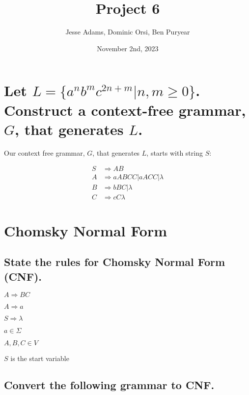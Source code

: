 \documentclass{article}
\title{Project 6}
\author{Jesse Adams, Dominic Orsi, Ben Puryear}
\date{November 2nd, 2023}
\begin{document}
\maketitle

\section{ Let $L = \{a^n b^m c^{2n+m} | n, m \ge 0\}$.  Construct a context-free grammar, $G$, that generates $L$.}

Our context free grammar, $G$, that generates $L$, starts with string $S$:

\begin{align*}
    S & \Rightarrow A B                           \\
    A & \Rightarrow a A B C C | a A C C | \lambda \\
    B & \Rightarrow b B C | \lambda               \\
    C & \Rightarrow c C \lambda
\end{align*}

\section{Chomsky Normal Form}

\subsection{State the rules for Chomsky Normal Form (CNF).}

\begin{list}{}{A CFG is in CNF if every rule is of the form:}
    \item $A \Rightarrow BC$
    \item $A \Rightarrow a$
    \item $S \Rightarrow \lambda$
\end{list}

\begin{list}{}{Where:}
    \item $a \in \Sigma$
    \item $A, B, C \in V$
    \item $S$ is the start variable
\end{list}

\subsection{Convert the following grammar to CNF.}
\end{document}

